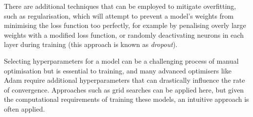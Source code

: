 There are additional techniques that can be employed to mitigate overfitting, such as regularisation, which will attempt to prevent a model's weights from minimising the loss function too perfectly, for example by penalising overly large weights with a modified loss function, or randomly deactivating neurons in each layer during training (this approach is known as \emph{dropout}).

Selecting hyperparameters for a model can be a challenging process of manual optimisation but is essential to training, and many advanced optimisers like Adam require additional hyperparameters that can drastically influence the rate of convergence.
Approaches such as grid searches can be applied here, but given the computational requirements of training these models, an intuitive approach is often applied.